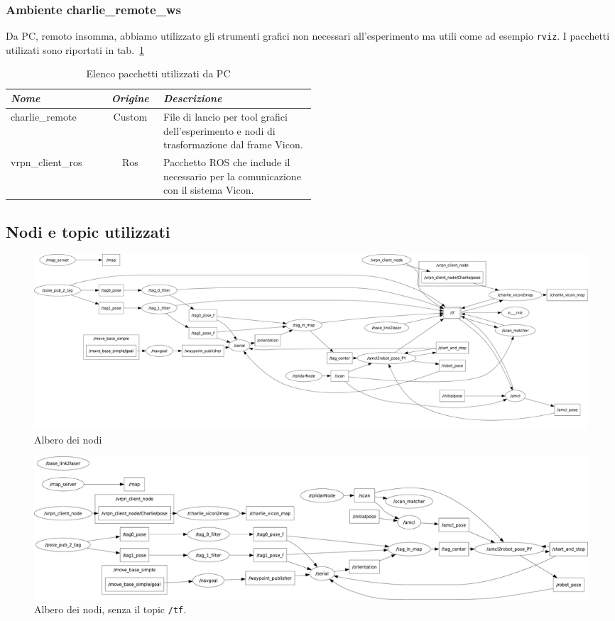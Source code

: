 \subsubsection*{Ambiente charlie\_remote\_ws}
Da PC, remoto insomma, abbiamo utilizzato gli strumenti grafici non necessari all'esperimento ma utili come ad esempio \verb|rviz|. I pacchetti utilizati sono riportati in tab.~\ref{tab: pacchetti remoto}
\begin{table}[h]
	\centering
	\begin{tabular}{lcp{0.5\linewidth}}
		\textit{Nome} 	& \textit{Origine} & \textit{Descrizione} \\
		\hline
		charlie\_remote			& Custom	& File di lancio per tool grafici dell'esperimento e nodi di trasformazione dal frame Vicon.\\
		vrpn\_client\_ros		& Ros		& Pacchetto ROS che include il necessario per la comunicazione con il sistema Vicon.\\
	\end{tabular}
	\caption{Elenco pacchetti utilizzati da PC}
	\label{tab: pacchetti remoto}
\end{table}
\FloatBarrier

	
\subsection{Nodi e topic utilizzati}
\label{sez:Ambiente ROS creato, nodi e topic}
\begin{figure}[h]
	\centering
	\includegraphics[width=\linewidth]{nodes_withtf_tree.pdf}
	\caption{Albero dei nodi}
	\label{fig: rqt_graph}
\end{figure}

\begin{figure}[h]
	\centering
	\includegraphics[width=\linewidth]{nodes_tree.pdf}
	\caption{Albero dei nodi, senza il topic \texttt{/tf}.}
	\label{fig: rqt_graph no tf}
\end{figure}



